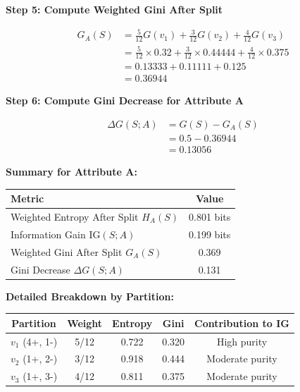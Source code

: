 \documentclass[12pt]{article}
\begin{document}
\begin{solution}
\textbf{Step 5: Compute Weighted Gini After Split}

\begin{align*}
G_A(S) &= \frac{5}{12} G(v_1) + \frac{3}{12} G(v_2) + \frac{4}{12} G(v_3) \\
&= \frac{5}{12} \times 0.32 + \frac{3}{12} \times 0.44444 + \frac{4}{12} \times 0.375 \\
&= 0.13333 + 0.11111 + 0.125 \\
&= 0.36944
\end{align*}

\textbf{Step 6: Compute Gini Decrease for Attribute A}

\begin{align*}
\Delta G(S; A) &= G(S) - G_A(S) \\
&= 0.5 - 0.36944 \\
&= 0.13056
\end{align*}

\textbf{Summary for Attribute A:}

\begin{center}
\begin{tabular}{|l|c|}
\hline
\textbf{Metric} & \textbf{Value} \\
\hline
Weighted Entropy After Split $H_A(S)$ & 0.801 bits \\
Information Gain $\text{IG}(S; A)$ & 0.199 bits \\
Weighted Gini After Split $G_A(S)$ & 0.369 \\
Gini Decrease $\Delta G(S; A)$ & 0.131 \\
\hline
\end{tabular}
\end{center}

\textbf{Detailed Breakdown by Partition:}

\begin{center}
\begin{tabular}{|c|c|c|c|c|}
\hline
\textbf{Partition} & \textbf{Weight} & \textbf{Entropy} & \textbf{Gini} & \textbf{Contribution to IG} \\
\hline
$v_1$ (4+, 1-) & 5/12 & 0.722 & 0.320 & High purity \\
$v_2$ (1+, 2-) & 3/12 & 0.918 & 0.444 & Moderate purity \\
$v_3$ (1+, 3-) & 4/12 & 0.811 & 0.375 & Moderate purity \\
\hline
\end{tabular}
\end{center}
\end{solution}
\end{document}

